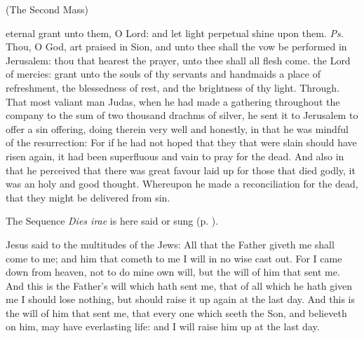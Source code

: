 {}
\centerline{\small{(The Second Mass)}}\label{AllSoulsII}
\par
\introit
{} eternal grant unto them, O Lord: and let light perpetual shine upon them. \textit{Ps.} Thou, O God, art praised in Sion, and unto thee shall the vow be performed in Jerusalem: thou that hearest the prayer, unto thee shall all flesh come.
\collect
{} the Lord of mercies: grant unto the souls of thy servants and handmaids a place of refreshment, the blessedness of rest, and the brightness of thy light. Through.
 That most valiant man Judas, when he had made a gathering throughout the company to the sum of two thousand drachms of silver, he sent it to Jerusalem to offer a sin offering, doing therein very well and honestly, in that he was mindful of the resurrection: For if he had not hoped that they that were slain should have risen again, it had been superfluous and vain to pray for the dead. And also in that he perceived that there was great favour laid up for those that died godly, it was an holy and good thought. Whereupon he made a reconciliation for the dead, that they might be delivered from sin.
\begin{rubric}
    The Sequence \emph{Dies irae} is here said or sung (p. \pageref{diesirae}).
\end{rubric}
 Jesus said to the multitudes of the Jews: All that the Father giveth me shall come to me; and him that cometh to me I will in no wise cast out. For I came down from heaven, not to do mine own will, but the will of him that sent me. And this is the Father's will which hath sent me, that of all which he hath given me I should lose nothing, but should raise it up again at the last day. And this is the will of him that sent me, that every one which seeth the Son, and believeth on him, may have everlasting life: and I will raise him up at the last day.
